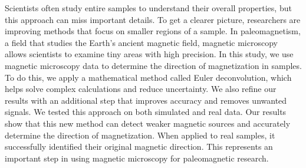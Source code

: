 Scientists often study entire samples to understand their overall properties, but this approach can miss important details. To get a clearer picture, researchers are improving methods that focus on smaller regions of a sample. In paleomagnetism, a field that studies the Earth's ancient magnetic field, magnetic microscopy allows scientists to examine tiny areas with high precision. In this study, we use magnetic microscopy data to determine the direction of magnetization in samples. To do this, we apply a mathematical method called Euler deconvolution, which helps solve complex calculations and reduce uncertainty. We also refine our results with an additional step that improves accuracy and removes unwanted signals. We tested this approach on both simulated and real data. Our results show that this new method can detect weaker magnetic sources and accurately determine the direction of magnetization. When applied to real samples, it successfully identified their original magnetic direction. This represents an important step in using magnetic microscopy for paleomagnetic research.
